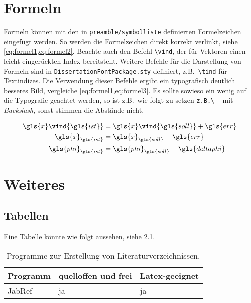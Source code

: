 
\chapter{Formeln} \label{sec:Formeln}

Formeln können mit den in \texttt{preamble/symbolliste} definierten Formelzeichen eingefügt werden. So werden die Formelzeichen direkt korrekt verlinkt, siehe \cref{eq:formel1,eq:formel2}. Beachte auch den Befehl \texttt{\textbackslash vind}, der für Vektoren einen leicht eingerückten Index bereitstellt. Weitere Befehle für die Darstellung von Formeln sind in \texttt{DissertationFontPackage.sty} definiert, z.B.\ \texttt{\textbackslash tind} für Textindizes. Die Verwendung dieser Befehle ergibt ein typografisch deutlich besseres Bild, vergleiche \cref{eq:formel1,eq:formel3}. Es sollte sowieso ein wenig auf die Typografie geachtet werden, so ist z.B.\ wie folgt zu setzen \texttt{z.B.\textbackslash} -- mit \textit{Backslash}, sonst stimmen die Abstände nicht.

\begin{align}
	\label{eq:formel1}
	\gls{x}\vind{\gls{ist}} & = \gls{x}\vind{\gls{soll}} + \gls{err}    \\
	\label{eq:formel3}
	\gls{x}_{\gls{ist}}     & = \gls{x}_{\gls{soll}} + \gls{err}        \\
	\label{eq:formel2}
	\gls{phi}_{\gls{ist}}   & = \gls{phi}_{\gls{soll}} + \gls{deltaphi}
\end{align}

\blindtext[3]


\chapter{Weiteres}

\section{Tabellen}
\label{sec:HFS_Wahrnehmung}

Eine Tabelle könnte wie folgt aussehen, siehe \cref{tab:programme}.

\begin{table}[hbt]
	\centering
	\caption{Programme zur Erstellung von Literaturverzeichnissen.}
	\label{tab:programme}
	\begin{tabular}{lll}
		\toprule
		Programm & quelloffen und frei & Latex-geeignet \\ \midrule
		JabRef   & ja                  & ja             \\ \bottomrule
	\end{tabular}
\end{table}

